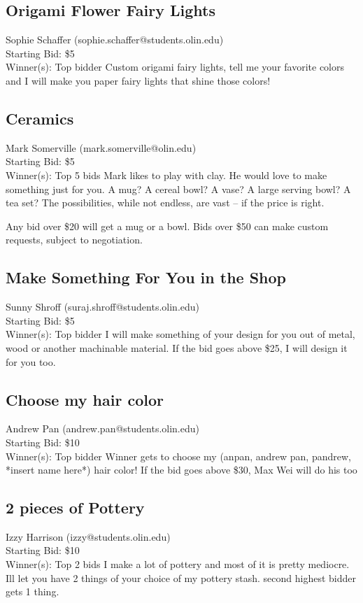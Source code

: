 \documentclass[11pt]{article}
\begin{document}
\subsection{Origami Flower Fairy Lights}
Sophie Schaffer (sophie.schaffer@students.olin.edu) \\
Starting Bid: \$5 \\
Winner(s): 
Top bidder\newline
Custom origami fairy lights, tell me your favorite colors and I will make you paper fairy lights that shine those colors!
\subsection{Ceramics}
Mark Somerville (mark.somerville@olin.edu) \\
Starting Bid: \$5 \\
Winner(s): 
Top 5 bids\newline
Mark likes to play with clay.  He would love to make something just for you.  A mug?  A cereal bowl?  A vase?  A large serving bowl?  A tea set?  The possibilities, while not endless, are vast -- if the price is right.

Any bid over \$20 will get a mug or a bowl.  Bids over \$50 can make custom requests, subject to negotiation.
\subsection{Make Something For You in the Shop}
Sunny Shroff (suraj.shroff@students.olin.edu) \\
Starting Bid: \$5 \\
Winner(s): 
Top bidder\newline
I will make something of your design for you out of metal, wood or another machinable material. If the bid goes above \$25, I will design it for you too.
\subsection{Choose my hair color}
Andrew Pan (andrew.pan@students.olin.edu) \\
Starting Bid: \$10 \\
Winner(s): 
Top bidder\newline
Winner gets to choose my (anpan, andrew pan, pandrew, *insert name here*) hair color!  If the bid goes above \$30, Max Wei will do his too
\subsection{2 pieces of Pottery}
Izzy Harrison (izzy@students.olin.edu) \\
Starting Bid: \$10 \\
Winner(s): 
Top 2 bids\newline
I make a lot of pottery and most of it is pretty mediocre. Ill let you have 2 things of your choice of my pottery stash. second highest bidder gets 1 thing.
\end{document}
